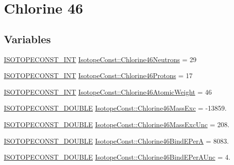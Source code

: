 \hypertarget{group___isotope_const-_chlorine-_cl46}{}\section{Chlorine 46}
\label{group___isotope_const-_chlorine-_cl46}
\subsection*{Variables}
\begin{DoxyCompactItemize}
\item 
\mbox{\hyperlink{group___isotope_const-_macros_ga5f18360b3e99483a35c32d789e62621c}{I\+S\+O\+T\+O\+P\+E\+C\+O\+N\+S\+T\+\_\+\+I\+NT}} \mbox{\hyperlink{group___isotope_const-_chlorine-_cl46_gaa7d49d27b372c0ea72bb126d2d84e6a9}{Isotope\+Const\+::\+Chlorine46\+Neutrons}} = 29
\item 
\mbox{\hyperlink{group___isotope_const-_macros_ga5f18360b3e99483a35c32d789e62621c}{I\+S\+O\+T\+O\+P\+E\+C\+O\+N\+S\+T\+\_\+\+I\+NT}} \mbox{\hyperlink{group___isotope_const-_chlorine-_cl46_ga6d91210fe2429be0bee465bb80866e42}{Isotope\+Const\+::\+Chlorine46\+Protons}} = 17
\item 
\mbox{\hyperlink{group___isotope_const-_macros_ga5f18360b3e99483a35c32d789e62621c}{I\+S\+O\+T\+O\+P\+E\+C\+O\+N\+S\+T\+\_\+\+I\+NT}} \mbox{\hyperlink{group___isotope_const-_chlorine-_cl46_gaaaec5cea09723c5ccdd59cd154f13a29}{Isotope\+Const\+::\+Chlorine46\+Atomic\+Weight}} = 46
\item 
\mbox{\hyperlink{group___isotope_const-_macros_ga8f45a7272ce02c0b4c65c44636ed719a}{I\+S\+O\+T\+O\+P\+E\+C\+O\+N\+S\+T\+\_\+\+D\+O\+U\+B\+LE}} \mbox{\hyperlink{group___isotope_const-_chlorine-_cl46_ga582d06e1b5771e863b6f6a5ba1fd9a4d}{Isotope\+Const\+::\+Chlorine46\+Mass\+Exc}} = -\/13859.
\item 
\mbox{\hyperlink{group___isotope_const-_macros_ga8f45a7272ce02c0b4c65c44636ed719a}{I\+S\+O\+T\+O\+P\+E\+C\+O\+N\+S\+T\+\_\+\+D\+O\+U\+B\+LE}} \mbox{\hyperlink{group___isotope_const-_chlorine-_cl46_ga2e4cd468a795758f44d8587af48742e3}{Isotope\+Const\+::\+Chlorine46\+Mass\+Exc\+Unc}} = 208.
\item 
\mbox{\hyperlink{group___isotope_const-_macros_ga8f45a7272ce02c0b4c65c44636ed719a}{I\+S\+O\+T\+O\+P\+E\+C\+O\+N\+S\+T\+\_\+\+D\+O\+U\+B\+LE}} \mbox{\hyperlink{group___isotope_const-_chlorine-_cl46_ga67dc17f6585b09659a16e407ad019641}{Isotope\+Const\+::\+Chlorine46\+Bind\+E\+PerA}} = 8083.
\item 
\mbox{\hyperlink{group___isotope_const-_macros_ga8f45a7272ce02c0b4c65c44636ed719a}{I\+S\+O\+T\+O\+P\+E\+C\+O\+N\+S\+T\+\_\+\+D\+O\+U\+B\+LE}} \mbox{\hyperlink{group___isotope_const-_chlorine-_cl46_gab42cef4c67f2967fe226757f33876b6e}{Isotope\+Const\+::\+Chlorine46\+Bind\+E\+Per\+A\+Unc}} = 4.

\end{DoxyCompactItemize}
